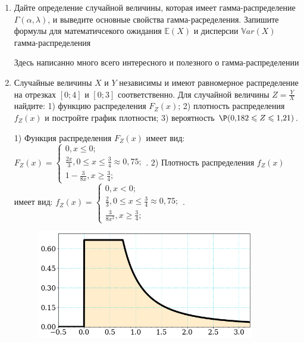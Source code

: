 \documentclass[a4paper,14pt]{article}
\begin{document}
\begin{enumerate}


\item

Дайте определение случайной величины, которая имеет гамма-распределение $\Gamma(\alpha,  \lambda)$, и выведите основные свойства гамма-расределения. Запишите формулы для математичсекого ожидания
$\mathbb{E}(X)$ и дисперсии $\mathbb{V}ar(X)$ гамма-распределения




Здесь написанно много всего интересного и полезного о гамма-распределении


\item



Случайные величины $X$ и $Y$ независимы и имеют равномерное
распределение на отрезках $[0;4]$ и $[0;3]$ соответственно. Для случайной величины $Z=\frac{Y}{X}$ найдите: 
1) функцию распределения $F_Z(x)$;
2) плотность распределения $f_Z(x)$ и постройте график плотности;
3) вероятность $\P(0,\!182\leqslant Z\leqslant 1,\!21)$.




1) Функция распределения $F_Z(x)$ имеет вид:
$
F_Z(x)=\left\{
\begin{array}{l}
0, x\leqslant 0;\\
\frac{2 x}{3}, 0\leqslant x\leqslant \frac{3}{4}\approx 0,\!75;\\
1 - \frac{3}{8 x}, x\geqslant\frac{3}{4};
\end{array}.
\right.
$
2) Плотность распределения $f_Z(x)$ имеет вид:
$
f_Z(x)=\left\{
\begin{array}{l}
0, x<0;\\
\frac{2}{3}, 0\leqslant x\leqslant \frac{3}{4}\approx 0,\!75;\\
\frac{3}{8 x^{2}}, x\geqslant\frac{3}{4};
\end{array}.
\right.
$


\begin{figure}[H]
    \includegraphics[width=0.9\textwidth]{2_53d11}
\end{figure}



\end{enumerate}
\end{document}
